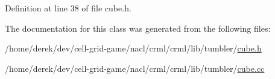 Definition at line 38 of file cube.h.



The documentation for this class was generated from the following files:\begin{DoxyCompactItemize}
\item 
/home/derek/dev/cell-\/grid-\/game/nacl/crml/crml/lib/tumbler/\hyperlink{cube_8h}{cube.h}\item 
/home/derek/dev/cell-\/grid-\/game/nacl/crml/crml/lib/tumbler/\hyperlink{cube_8cc}{cube.cc}\end{DoxyCompactItemize}
